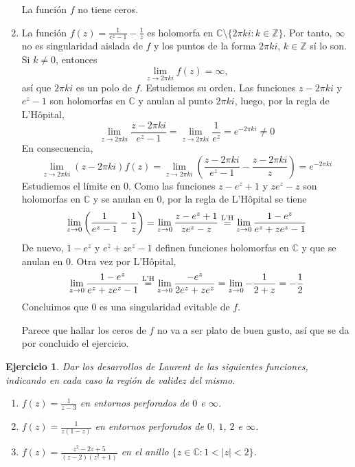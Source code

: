 \documentclass[11pt]{report}
\makeatletter
\renewenvironment{proof}[1][\proofname]{\par
  \pushQED{\qed}%
  \normalfont \topsep\z@skip %
  \trivlist
  \item[\hskip\labelsep
        \itshape
    #1\@addpunct{.}]\ignorespaces
}{%
  \popQED\endtrivlist\@endpefalse
}
\newcommand{\Z}{\mathbb Z}
\newcommand{\C}{\mathbb C}
\newtheorem{ejercicio}{Ejercicio}
\makeatother
\begin{document}
\begin{proof}
\begin{enumerate}
  La función $f$ no tiene ceros.
  \item La función $f(z)=\frac{1}{e^z-1}-\frac{1}{z}$ es holomorfa en $\C \setminus \{2\pi k i \colon k \in \Z\}$. Por tanto, $\infty$ no es singularidad aislada de $f$ y los puntos de la forma $2\pi k i$, $k \in \Z$ sí lo son. Si $k \neq 0$, entonces
  \[\lim_{z \to 2\pi k i} f(z)= \infty,\]
  así que $2\pi k i$ es un polo de $f$. Estudiemos su orden. Las funciones $z-2\pi k i$ y $e^z-1$ son holomorfas en $\C$ y anulan al punto $2\pi ki$, luego, por la regla de L'Hôpital,
  \[\lim_{z \to 2\pi ki} \frac{z-2\pi ki }{e^z-1} = \lim_{z \to 2\pi k i} \frac{1}{e^z} = e^{-2\pi ki} \neq 0\]
  En consecuencia,
  \[\lim_{z \to 2\pi k i} (z-2\pi k i)f(z)=\lim_{z \to 2\pi k i}\left(\frac{z-2\pi k i}{e^z-1} -\frac{z-2\pi k i}{z}\right) = e^{-2\pi k i}\]
  Estudiemos el límite en $0$. Como las funciones $z-e^z+1$ y $ze^z-z$ son holomorfas en $\C$ y se anulan en $0$, por la regla de L'Hôpital se tiene
  \[\lim_{z \to 0}\left(\frac{1}{e^z-1}-\frac{1}{z}\right) = \lim_{z \to 0} \frac{z-e^z+1}{ze^z-z} \overset{\textup{L'H}}{=} \lim_{z \to 0} \frac{1-e^z}{e^z+ze^z-1}\]
  De nuevo, $1-e^z$ y $e^z+ze^z-1$ definen funciones holomorfas en $\C$ y que se anulan en $0$. Otra vez por L'Hôpital,
  \[\lim_{z \to 0} \frac{1-e^z}{e^z+ze^z-1} \overset{\textup{L'H}}{=} \lim_{z \to 0} \frac{-e^z}{2e^z+ze^z} = \lim_{z \to 0} -\frac{1}{2+z} = -\frac{1}{2}\]
  Concluimos que $0$ es una singularidad evitable de $f$. 
  
  Parece que hallar los ceros de $f$ no va a ser plato de buen gusto, así que se da por concluido el ejercicio.
  \qedhere
\end{enumerate}
\end{proof}

\pagebreak

\begin{ejercicio}
  Dar los desarrollos de Laurent de las siguientes funciones, indicando en cada caso la región de validez del mismo.
  \begin{enumerate}
    \item $\displaystyle f(z)=\frac{1}{z-3}$ en entornos perforados de $0$ e $\infty$.
    \item $\displaystyle f(z)=\frac{1}{z(1-z)}$ en entornos perforados de $0$, $1$, $2$ e $\infty$.
    \item $\displaystyle f(z)=\frac{z^2-2z+5}{(z-2)(z^2+1)}$ en el anillo $\{z \in \C \colon 1<|z|<2\}$.
  \end{enumerate}
\end{ejercicio}
\end{document}
